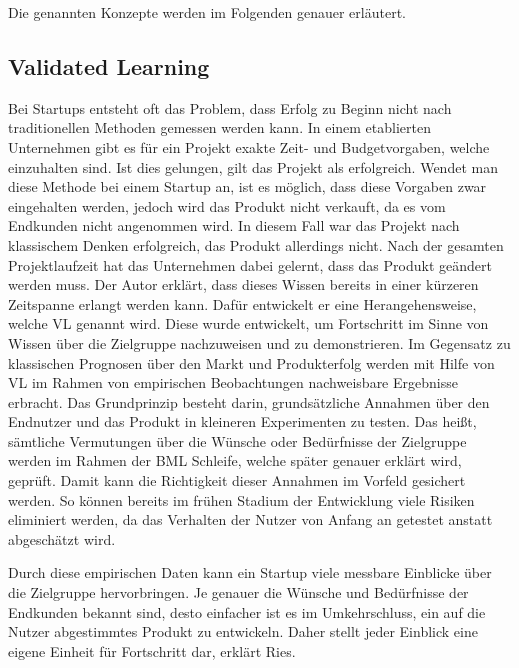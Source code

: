Die genannten Konzepte werden im Folgenden genauer erläutert.

\subsection*{\label{sec:LeanStartup-ValidatedLearning}\thesubsection\quad Validated Learning}
Bei Startups entsteht oft das Problem, dass Erfolg zu Beginn nicht nach traditionellen Methoden gemessen werden kann. In einem etablierten Unternehmen gibt es für ein Projekt exakte Zeit- und Budgetvorgaben, welche einzuhalten sind. Ist dies gelungen, gilt das Projekt als erfolgreich. Wendet man diese Methode bei einem Startup an, ist es möglich, dass diese Vorgaben zwar eingehalten werden, jedoch wird das Produkt nicht verkauft, da es vom Endkunden nicht angenommen wird. In diesem Fall war das Projekt nach klassischem Denken erfolgreich, das Produkt allerdings nicht. Nach der gesamten Projektlaufzeit hat das Unternehmen dabei gelernt, dass das Produkt geändert werden muss. Der Autor erklärt, dass dieses Wissen bereits in einer kürzeren Zeitspanne erlangt werden kann. Dafür entwickelt er eine Herangehensweise, welche \ac{VL} genannt wird. Diese wurde entwickelt, um Fortschritt im Sinne von Wissen über die Zielgruppe nachzuweisen und zu demonstrieren. Im Gegensatz zu klassischen Prognosen über den Markt und Produkterfolg werden mit Hilfe von \ac{VL} im Rahmen von empirischen Beobachtungen nachweisbare Ergebnisse erbracht. Das Grundprinzip besteht darin, grundsätzliche Annahmen über den Endnutzer und das Produkt in kleineren Experimenten zu testen. Das heißt, sämtliche Vermutungen über die Wünsche oder Bedürfnisse der Zielgruppe werden im Rahmen der \ac{BML} Schleife, welche später genauer erklärt wird, geprüft. Damit kann die Richtigkeit dieser Annahmen im Vorfeld gesichert werden. So können bereits im frühen Stadium der Entwicklung viele Risiken eliminiert werden, da das Verhalten der Nutzer von Anfang an getestet anstatt abgeschätzt wird.

Durch diese empirischen Daten kann ein Startup viele messbare Einblicke über die Zielgruppe hervorbringen. Je genauer die Wünsche und Bedürfnisse der Endkunden bekannt sind, desto einfacher ist es im Umkehrschluss, ein auf die Nutzer abgestimmtes Produkt zu entwickeln. Daher stellt jeder Einblick eine eigene Einheit für Fortschritt dar, erklärt Ries.

